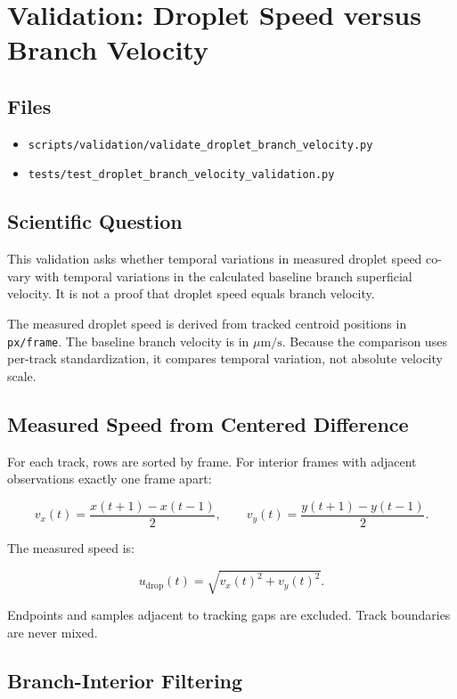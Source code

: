 \section{Validation: Droplet Speed versus Branch Velocity}

\subsection{Files}

\begin{itemize}
  \item \texttt{scripts/validation/validate\_droplet\_branch\_velocity.py}
  \item \texttt{tests/test\_droplet\_branch\_velocity\_validation.py}
\end{itemize}

\subsection{Scientific Question}

This validation asks whether temporal variations in measured droplet speed
co-vary with temporal variations in the calculated baseline branch superficial
velocity. It is not a proof that droplet speed equals branch velocity.

The measured droplet speed is derived from tracked centroid positions in
\texttt{px/frame}. The baseline branch velocity is in
\(\mu\mathrm{m}/\mathrm{s}\). Because the comparison uses per-track
standardization, it compares temporal variation, not absolute velocity scale.

\subsection{Measured Speed from Centered Difference}

For each track, rows are sorted by frame. For interior frames with adjacent
observations exactly one frame apart:

\[
v_x(t)
=
\frac{x(t+1)-x(t-1)}{2},
\qquad
v_y(t)
=
\frac{y(t+1)-y(t-1)}{2}.
\]

The measured speed is:

\[
u_{\mathrm{drop}}(t)
=
\sqrt{v_x(t)^2+v_y(t)^2}.
\]

Endpoints and samples adjacent to tracking gaps are excluded. Track boundaries
are never mixed.

\subsection{Branch-Interior Filtering}

